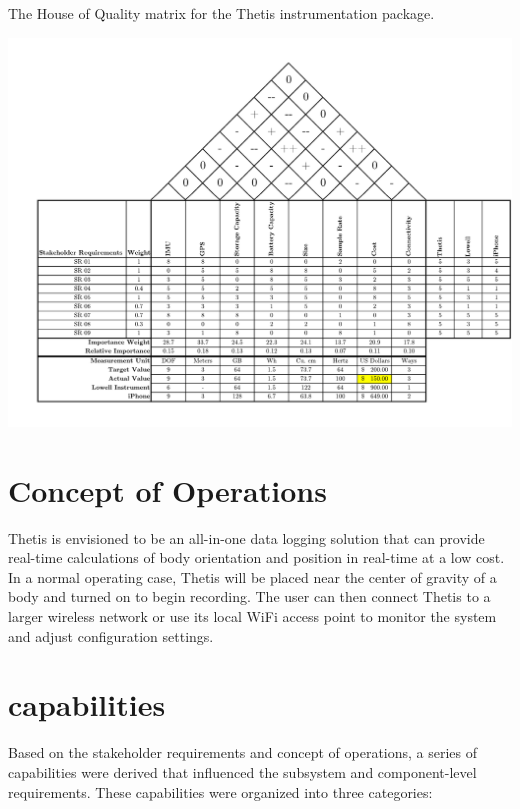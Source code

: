 \begin{landscape}
	\begin{table}
		\caption[House of Quality]{The House of Quality matrix for the Thetis instrumentation package.}
		\label{tab:hoq}
		\centering
		\includegraphics[height=\textwidth-24pt]{../include/ThetisHOQ.pdf}
	\end{table}
\end{landscape}

\section{Concept of Operations} \label{sec:conops}
Thetis is envisioned to be an all-in-one data logging solution that can provide real-time calculations of body orientation and position in real-time at a low cost.
In a normal operating case, Thetis will be placed near the center of gravity of a body and turned on to begin recording.
The user can then connect Thetis to a larger wireless network or use its local WiFi access point to monitor the system and adjust configuration settings.

\section{capabilities} \label{sec:capabilities}
Based on the stakeholder requirements and concept of operations, a series of capabilities were derived that influenced the subsystem and component-level requirements.
These capabilities were organized into three categories:

